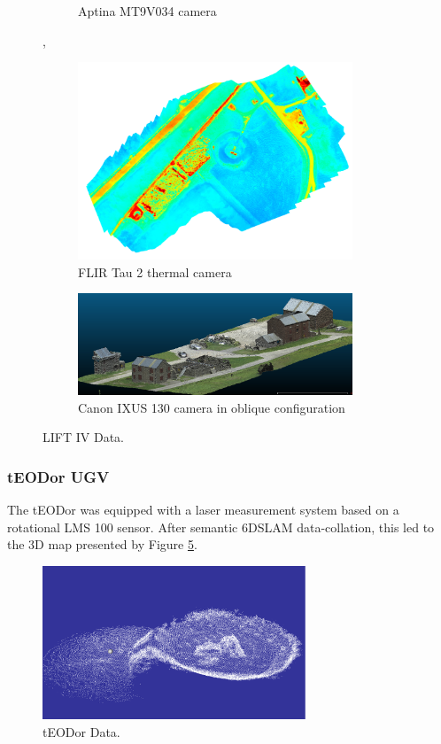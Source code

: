 \documentclass{article}
\begin{document}
\begin{figure} [h]
\begin{subfigure} [b]{0.49\textwidth}
         \caption{Aptina MT9V034 camera}
         \label{fig:ad2}
    \end{subfigure},
    \begin{subfigure} [b]{0.49\textwidth}
         \centering
         \includegraphics[width=0.9\textwidth]{ROB-15-0035_fig25c.png}
         \caption{FLIR Tau 2 thermal camera}
         \label{fig:ad3}
    \end{subfigure}%
    \begin{subfigure} [b]{0.49\textwidth}
         \centering
         \includegraphics[width=0.9\textwidth]{ROB-15-0035_fig25d.png}
          \caption{Canon IXUS 130 camera in oblique configuration}
         \label{fig:ad4}
    \end{subfigure}%
    \caption{LIFT IV Data.}
    \label{fig:adata}
\end{figure}
\subsubsection{tEODor UGV}
The tEODor was equipped with a laser measurement system based on a rotational LMS 100 sensor.
After semantic 6DSLAM data-collation, this led to the 3D map presented by Figure \ref{fig:tEODorData}.
\begin{figure}
    \centering
    \includegraphics[width=0.7\textwidth]{ROB-15-0035_fig26.png}
    \caption{tEODor Data.}
    \label{fig:tEODorData}
\end{figure}
\end{document}
